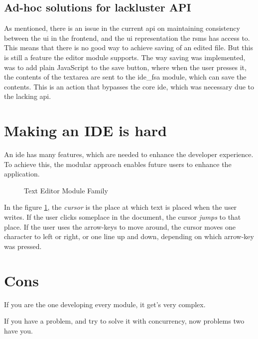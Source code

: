 \subsection{Ad-hoc solutions for lackluster API}

As mentioned, there is an issue in the current \gls*{api} on maintaining
consistency between the \gls*{ui} in the frontend, and the \gls*{ui}
representation the \gls*{rsms} has access to. This means that there is no
good way to achieve saving of an edited file. But this is still a feature the
editor module supports. The way saving was implemented, was to add plain
JavaScript to the save button, where when the user presses it, the contents
of the textarea are sent to the \gls*{ide}\_fsa module, which can save the
contents. This is an action that bypasses the core \gls*{ide}, which was
necessary due to the lacking \gls*{api}.

\section{Making an IDE is hard}

An \gls*{ide} has many features, which are needed to enhance the developer
experience. To achieve this, the modular approach enables future users to
enhance the application.

\begin{figure}
  \centering
  
  \caption{Text Editor Module Family}
  \label{fig:extendedModuleFamily}
\end{figure}

In the figure \ref{fig:extendedModuleFamily}, the \textit{cursor} is the place
at which text is placed when the user writes. If the user clicks someplace in
the document, the cursor \textit{jumps} to that place. If the user uses the
arrow-keys to move around, the cursor moves one character to left or right, or
one line up and down, depending on which arrow-key was pressed.

\section{Cons}

If you are the one developing every module, it get's very complex.

If you have a problem, and try to solve it with concurrency, now problems two
have you.

